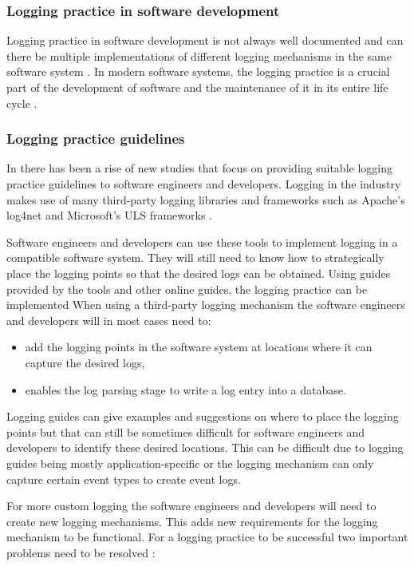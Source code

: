 \subsubsection{Logging practice in software development}
Logging practice in software development is not always well documented and can there be multiple implementations of different logging mechanisms in the same software system \cite{Pecchia2015, Kitchenham2007}. In modern software systems, the logging practice is a crucial part of the development of software and the maintenance of it in its entire life cycle \cite{Rong2018}.

\subsubsection{Logging practice guidelines}
In  there has been a rise of new studies that focus on providing suitable logging practice guidelines to software engineers and developers. Logging in the industry makes use of many third-party logging libraries and frameworks such as Apache's log4net and Microsoft's ULS frameworks \cite{Zhu2015, Rong2018}.\par Software engineers and developers can use these tools to implement logging in a compatible software system. They will still need to know how to strategically place the logging points so that the desired logs can be obtained. Using guides provided by the tools and other online guides, the logging practice can be implemented When using a third-party logging mechanism the software engineers and developers will in most cases need to:

\begin{itemize}
	\item add the logging points in the software system at locations where it can capture the desired logs,
	\item enables the log parsing stage to write a log entry into a database.
\end{itemize}

Logging guides can give examples and suggestions on where to place the logging points but that can still be sometimes difficult for software engineers and developers to identify these desired locations. This can be difficult due to logging guides being mostly application-specific or the logging mechanism can only capture certain event types to create event logs. \par For more custom logging the software engineers and developers will need to create new logging mechanisms. This adds new requirements for the logging mechanism to be functional. For a logging practice to be successful two important problems need to be resolved \cite{Zhu2015, Zhu2019, Rong2018}:

